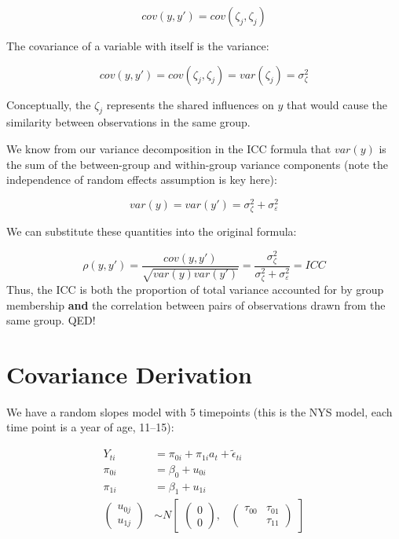\documentclass[
  letterpaper,
  DIV=11,
  numbers=noendperiod]{scrreprt}
\begin{document}
\[
cov(y,y') = cov(\zeta_j, \zeta_j) 
\]

The covariance of a variable with itself is the variance:

\[
cov(y,y') = cov(\zeta_j, \zeta_j) = var(\zeta_j) = \sigma^2_\zeta
\]

Conceptually, the \(\zeta_j\) represents the shared influences on \(y\)
that would cause the similarity between observations in the same group.

We know from our variance decomposition in the ICC formula that
\(var(y)\) is the sum of the between-group and within-group variance
components (note the independence of random effects assumption is key
here):

\[
var(y) = var(y') = \sigma^2_\zeta + \sigma^2_\varepsilon
\]

We can substitute these quantities into the original formula:

\[
\rho(y, y') = \frac{cov(y,y')}{\sqrt{var(y)var(y')}} = \frac{\sigma^2_\zeta}{\sigma^2_\zeta + \sigma^2_\varepsilon} = ICC
\] Thus, the ICC is both the proportion of total variance accounted for
by group membership \textbf{and} the correlation between pairs of
observations drawn from the same group. QED!

\hypertarget{covariance-derivation}{%
\chapter{Covariance Derivation}\label{covariance-derivation}}

We have a random slopes model with 5 timepoints (this is the NYS model,
each time point is a year of age, 11--15):

\[\begin{aligned}
Y_{ti} &= \pi_{0i} + \pi_{1i} a_t + \tilde{\epsilon}_{ti} \\
\pi_{0i} &=  \beta_{0} + u_{0i} \\
\pi_{1i} &= \beta_{1} + u_{1i} \\
\begin{pmatrix} u_{0j} \\
u_{1j}
\end{pmatrix} &\sim  N
\begin{bmatrix}
\begin{pmatrix}
0 \\
0
\end{pmatrix}\!\!,&
\begin{pmatrix}
\tau_{00} & \tau_{01} \\
        & \tau_{11} 
\end{pmatrix}
\end{bmatrix}
\end{aligned}\]
\end{document}
